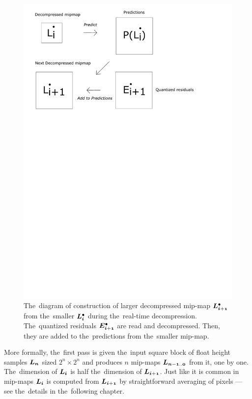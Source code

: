 \begin{figure}
	\includegraphics[trim={0 12cm 1cm 0cm}, clip, width=1\textwidth]{figures/single_decomp.pdf}\centering
	\caption{The~diagram of construction of larger decompressed mip-map $\ldot{i+1}$ from the~smaller $\ldot{i}$ during the~real-time decompression. The~quantized residuals $\objdot{E}{i+1}$ are read and decompressed. Then, they are added to the~predictions from the~smaller mip-map.}
	\label{fig:single_decomp}
\end{figure}

More formally, the~first pass is given the~input square block of float height samples $\lnorm{n}$ sized $2^n \times 2^n$ and produces $n$ mip-maps $\lnorm{n-1..0}$ from it, one by one. The~dimension of $\lnorm{i}$ is half the~dimension of $\lnorm{i+1}$. Just like it is common in mip-maps $\lnorm{i}$ is computed from $\lnorm{i+1}$ by straightforward averaging of pixels --- see the~details in the~following chapter. 

